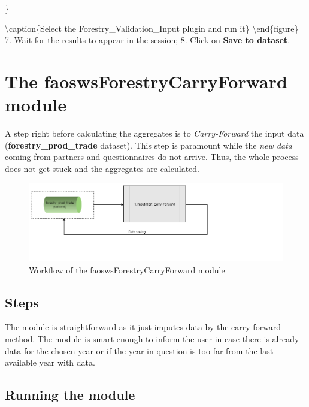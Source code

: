 \documentclass[
]{book}
\begin{document}
\}

\textbackslash caption\{Select the Forestry\_Validation\_Input plugin and run it\}\label{fig:InputValidationPlugin}
\textbackslash end\{figure\}
7. Wait for the results to appear in the session;
8. Click on \textbf{Save to dataset}.

\hypertarget{ForestryCarryForward}{%
\chapter{\texorpdfstring{\textbf{The faoswsForestryCarryForward module}}{The faoswsForestryCarryForward module}}\label{ForestryCarryForward}}

A step right before calculating the aggregates is to \emph{Carry-Forward} the input data (\textbf{forestry\_prod\_trade} dataset). This step is paramount while the \emph{new data} coming from partners and questionnaires do not arrive. Thus, the whole process does not get stuck and the aggregates are calculated.

\begin{figure}

{\centering \includegraphics[width=0.85\linewidth]{images/forestryCarryForward} 

}

\caption{Workflow of the faoswsForestryCarryForward module}\label{fig:forestryCarryForward}
\end{figure}

\hypertarget{steps-2}{%
\section{\texorpdfstring{\textbf{Steps}}{Steps}}\label{steps-2}}

The module is straightforward as it just imputes data by the carry-forward method. The module is smart enough to inform the user in case there is already data for the chosen year or if the year in question is too far from the last available year with data.

\hypertarget{running-the-module-2}{%
\section{\texorpdfstring{\textbf{Running the module}}{Running the module}}\label{running-the-module-2}}
\end{document}
